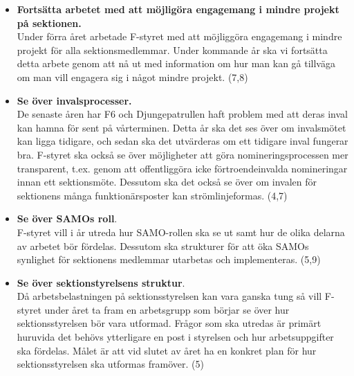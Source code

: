 \documentclass[a4paper]{article}
\begin{document}
\begin{itemize}
\item \textbf{Fortsätta arbetet med att möjligöra engagemang i mindre projekt på sektionen.}\\
Under förra året arbetade F-styret med att möjliggöra engagemang i mindre projekt för alla sektionsmedlemmar. Under kommande år ska vi fortsätta detta arbete genom att nå ut med information om hur man kan gå tillväga om man vill engagera sig i något mindre projekt. (7,8)


\item \textbf{Se över invalsprocesser.} \\
De senaste åren har F6 och Djungepatrullen haft problem med att deras inval kan hamna för sent på vårterminen. Detta år ska det ses över om invalsmötet kan ligga tidigare, och sedan ska det utvärderas om ett tidigare inval fungerar bra. F-styret ska också se över möjligheter att göra nomineringsprocessen mer transparent, t.ex. genom att offentliggöra icke förtroendeinvalda nomineringar innan ett sektionsmöte. Dessutom ska det också se över om invalen för sektionens många funktionärsposter kan strömlinjeformas. (4,7)%

\item \textbf{Se över SAMOs roll}.\\
F-styret vill i år utreda hur SAMO-rollen ska se ut samt hur de olika delarna av arbetet bör fördelas. Dessutom ska strukturer för att öka SAMOs synlighet för sektionens medlemmar utarbetas och implementeras. (5,9) %

\item \textbf{Se över sektionstyrelsens struktur}.\\
Då arbetsbelastningen på sektionsstyrelsen kan vara ganska tung så vill F-styret under året ta fram en arbetsgrupp som börjar se över hur sektionsstyrelsen bör vara utformad. Frågor som ska utredas är primärt huruvida det behövs ytterligare en post i styrelsen och hur arbetsuppgifter ska fördelas. Målet är att vid slutet av året ha en konkret plan för hur sektionsstyrelsen ska utformas framöver. (5)

\end{itemize}
\end{document}
